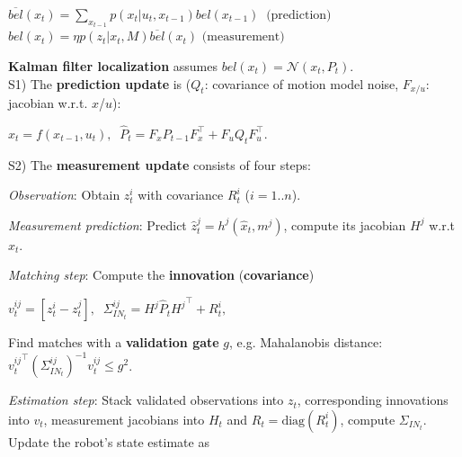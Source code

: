 \documentclass[landscape]{article}
\newcommand{\vmspace}{\vspace{-7pt}}
\newcommand{\vamspace}{\vspace{-3pt}}
\newcommand{\vpspace}{\vspace{5pt}}
\begin{document}
\begin{multicols}{3}
\begin{minipage}{\columnwidth}
  \vamspace

  \begin{algorithm}[H]
    {
    $
    \overline{bel}(x_t)
    =
    \sum_{x_{t-1}} p(x_t|u_t, x_{t-1}) bel(x_{t-1})
    \;\;
    \text{(prediction)}
    $\;
    $
    bel(x_t)
    =
    \eta p(z_t|x_t, M) \overline{bel}(x_t)
    $
    \hspace{29pt}
    $
    \text{(measurement)}
    $\;
    }
  \end{algorithm}
\end{minipage}

\vpspace


\begin{minipage}{\columnwidth}
  \textbf{Kalman filter localization} assumes
  $bel(x_t) = \mathcal N (x_t, P_t).  $\\
  S1) The \textbf{prediction update} is ($Q_t$: covariance of motion model
  noise, $F_{x/u}$: jacobian w.r.t. $x$/$u$):
  \vmspace
  \begin{center}
    $
    \hat x_t = f(x_{t-1}, u_t),\;\;
    \hat P_t = F_x P_{t-1} F_x^\intercal + F_u Q_t F_u^\intercal.
    $
  \end{center}
  \vmspace
  S2) The \textbf{measurement update} consists of four steps:
  \begin{compactenum}
  \item \textit{Observation}: Obtain $z_t^i$ with
    covariance $R_t^i$ ($i=1..n$).
  \item \textit{Measurement prediction}: Predict $\hat z_t^j = h^j(\hat x_t, m^j)$,
    compute its jacobian $H^j$ w.r.t $\hat x_t$.
  \item \textit{Matching step}: Compute the \textbf{innovation}
    (\textbf{covariance})

    \begin{center}
      $
      v_t^{ij}=[z_t^i - z_t^j],\;\;
      \Sigma_{IN_t}^{ij} = H^j \hat P_t {H^j}^\intercal + R_t^i,
      $
    \end{center}

    Find matches with a \textbf{validation gate} $g$, e.g. Mahalanobis distance:
    ${v_t^{ij}}^\intercal (\Sigma_{IN_t}^{ij})^{-1} v_t^{ij} \le g^2$.

  \item \textit{Estimation step}: Stack validated observations into $z_t$, corresponding
    innovations into $v_t$, measurement jacobians into $H_t$ and
    $R_t = \mathrm{diag}(R_t^i)$, compute $\Sigma_{IN_t}$. Update the robot's
    state estimate as


\end{compactenum}
\end{minipage}
\end{multicols}
\end{document}

